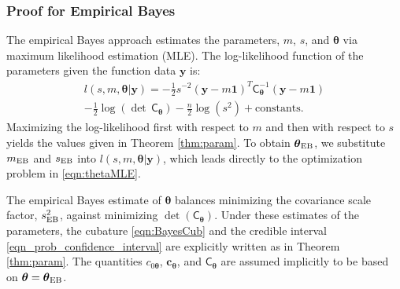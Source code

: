 \documentclass[twocolumn]{svjour3}          %
\newcommand{\bm}[1]{\boldsymbol{#1}}
\newcommand{\vtheta}{{\bm{\theta}}}
\newcommand{\vc}{\bm{c}}
\newcommand{\vy}{\bm{y}}
\newcommand{\vone}{\bm{1}}
\newcommand{\mC}{\mathsf{C}}
\newcommand{\mCInv}{\mathsf{C}^{-1}}
\newcommand{\MLE}{\textup{EB}}
\begin{document}
\subsubsection{Proof for Empirical Bayes}  \label{sec:MLE}
The empirical Bayes approach estimates the parameters, $m$, $s$, and $\vtheta$ via maximum likelihood estimation (MLE).  The log-likelihood function of the parameters given the function data $\vy$ is:
\begin{multline*}
l(s,m,\vtheta | \vy)
= -\frac{1}{2} s^{-2} (\vy-m\vone)^T\mCInv_\vtheta(\vy-m\vone) 
\\
 - \frac{1}{2} \log(\det\, \mC_\vtheta) - \frac{n}{2} \log(s^2) + \text{constants.}
\end{multline*}
Maximizing the log-likelihood first with respect to $m$ and then with respect to $s$ yields the values given in Theorem \ref{thm:param}.
To obtain $\vtheta_\MLE$, we substitute $m_\MLE$ and $s_\MLE$ into $l(s,m,\vtheta | \vy)$, which leads directly to the optimization problem in \eqref{eqn:thetaMLE}.

The empirical Bayes estimate of $\vtheta$ balances minimizing the covariance scale factor, $s^2_{\MLE}$, against minimizing  $\det(\mC_\vtheta)$. 
Under these estimates of the parameters, the cubature \eqref{eqn:BayesCub} and the credible interval \eqref{eqn_prob_confidence_interval} are explicitly written as in Theorem \ref{thm:param}.
The quantities $c_{0\vtheta}$, $\vc_\vtheta$, and $\mC_\vtheta$ are assumed implicitly to be based on $\vtheta = \vtheta_\MLE$.   


\end{document}
